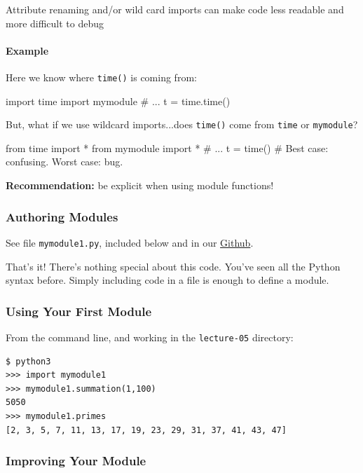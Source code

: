 \documentclass[12pt,letterpaper,twoside]{article}
\begin{document}
\begin{enumerate}
Attribute renaming and/or wild card imports can make code less
readable and more difficult to debug

\paragraph{Example}
Here we know where \texttt{time()} is coming from:

\begin{python}
import time
import mymodule
# ...
t = time.time()
\end{python}

But, what if we use wildcard imports...does \texttt{time()} come from \texttt{time} or \texttt{mymodule}?

\begin{python}
from time import *
from mymodule import *
# ...
t = time()   # Best case: confusing. Worst case: bug.
\end{python}

\textbf{Recommendation:} be explicit when using module functions!

\subsubsection{Authoring Modules}

See file \texttt{mymodule1.py}, included below and in our 
\href{https://github.com/CME211/notes/blob/fall_18/lecture-05/mymodule1.py}{Github}.



That's it! There's nothing special about this code. You've seen all the Python syntax before.
Simply including code in a file is enough to define a module.

\subsubsection{Using Your First Module}

From the command line, and working in the \texttt{lecture-05} directory:

\begin{verbatim}
$ python3
>>> import mymodule1
>>> mymodule1.summation(1,100)
5050
>>> mymodule1.primes
[2, 3, 5, 7, 11, 13, 17, 19, 23, 29, 31, 37, 41, 43, 47]
\end{verbatim}

\subsubsection{Improving Your Module}


\end{enumerate}
\end{document}
